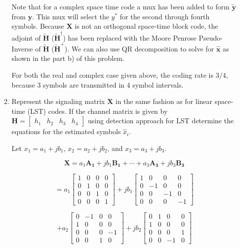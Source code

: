 \documentclass[fleqn]{article}
\begin{document}
\begin{enumerate}
\begin{enumerate}
			Note that for a complex space time code a mux has been added to form $\mathbf{\tilde{y}}$ from $\mathbf{y}$. This mux will select the $y^*$ for the second through fourth symbols. Because $\mathbf{X}$ is not an orthogonal space-time block code, the adjoint of $\mathbf{\tilde{H}}$ ($\mathbf{\tilde{H}^{\dagger}}$) has been replaced with the Moore Penrose Pseudo-Inverse of $\mathbf{\tilde{H}}$ ($\mathbf{\tilde{H}^+}$). We can also use QR decomposition to solve for $\mathbf{\hat{x}}$ as shown in the part b) of this problem.
			
			For both the real and complex case given above, the coding rate is $3/4$, because 3 symbols are transmitted in 4 symbol intervals.
			
			\item Represent the signaling matrix $\mathbf{X}$ in the same fashion as for linear space-time (LST) codes. If the channel matrix is given by $\mathbf{H}=\begin{bmatrix} h_1 & h_2 & h_3 & h_4 \end{bmatrix}$ using detection approach for LST determine the equations for the estimated symbols $\hat{x}_i$.
			
			Let $x_1 = a_1 + jb_1$, $x_2 = a_2 + jb_2$, and $x_3 = a_3 + jb_3$.
			
			\begin{equation*}
				\mathbf{X} = a_1\mathbf{A_1} + jb_1\mathbf{B_1} + \cdots + a_3\mathbf{A_3} + jb_3\mathbf{B_3}
			\end{equation*}
			
			\begin{equation*}
				= a_1\begin{bmatrix}
					1 & 0 & 0 & 0 \\
					0 & 1 & 0 & 0 \\
					0 & 0 & 1 & 0 \\
					0 & 0 & 0 & 1
				\end{bmatrix} + jb_1\begin{bmatrix}
					1 &  0 &  0 &  0 \\
					0 & -1 &  0 &  0 \\
					0 &  0 & -1 &  0 \\
					0 &  0 &  0 & -1
				\end{bmatrix}
			\end{equation*}
			
			\begin{equation*}
				 + a_2\begin{bmatrix}
					0 & -1 & 0 &  0 \\
					1 &  0 & 0 &  0 \\
					0 &  0 & 0 & -1 \\
					0 &  0 & 1 &  0
				\end{bmatrix} + jb_2\begin{bmatrix}
					0 & 1 &  0 & 0 \\
					1 & 0 &  0 & 0 \\
					0 & 0 &  0 & 1 \\
					0 & 0 & -1 & 0
				\end{bmatrix}
			\end{equation*}
			

\end{enumerate}
\end{enumerate}
\end{document}
